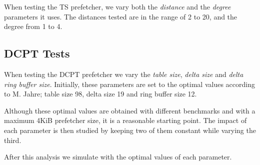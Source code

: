 When testing the TS prefetcher, we vary both the \emph{distance} and the
\emph{degree} parameters it uses. The distances tested are in the range of 2 to
20, and the degree from 1 to 4.

\subsection{DCPT Tests}

When testing the DCPT prefetcher we vary the \emph{table size}, \emph{delta
size} and \emph{delta ring buffer size}. Initially, these parameters are set to
the optimal values according to M. Jahre\cite{dcpt}; table size 98, delta size
19 and ring buffer size 12.

Although these optimal values are obtained with different benchmarks and with a
maximum 4KiB prefetcher size, it is a reasonable starting point. The impact of
each parameter is then studied by keeping two of them constant while varying the
third.

After this analysis we simulate with the optimal values of each parameter.

